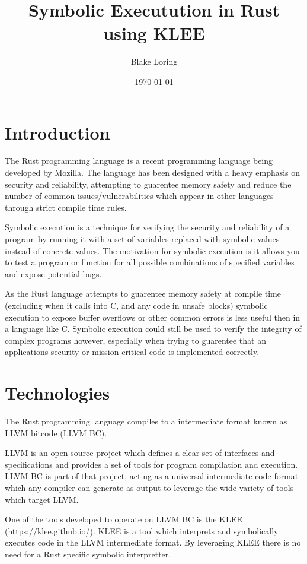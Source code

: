 \documentclass{report}
\begin{document}
\title{Symbolic Executution in Rust using KLEE}
\author{Blake Loring}
\date{\today}

\maketitle

\chapter {Introduction}

The Rust programming language is a recent programming language being developed by Mozilla. The language has been designed with a heavy emphasis on security and reliability, attempting to guarentee memory safety and reduce the number of common issues/vulnerabilities which appear in other languages through strict compile time rules.

Symbolic execution is a technique for verifying the security and reliability of a program by running it with a set of variables replaced with symbolic values instead of concrete values. The motivation for symbolic execution is it allows you to test a program or function for all possible combinations of specified variables and expose potential bugs.

As the Rust language attempts to guarentee memory safety at compile time (excluding when it calls into C, and any code in unsafe blocks) symbolic execution to expose buffer overflows or other common errors is less useful then in a language like C. Symbolic execution could still be used to verify the integrity of complex programs however, especially when trying to guarentee that an applications security or mission-critical code is implemented correctly.

\chapter {Technologies}

The Rust programming language compiles to a intermediate format known as LLVM bitcode (LLVM BC).

LLVM is an open source project which defines a clear set of interfaces and specifications and provides a set of tools for program compilation and execution. LLVM BC is part of that project, acting as a universal intermediate code format which any compiler can generate as output to leverage the wide variety of tools which target LLVM.

One of the tools developed to operate on LLVM BC is the KLEE (https://klee.github.io/). KLEE is a tool which interprets and symbolically executes code in the LLVM intermediate format. By leveraging KLEE there is no need for a Rust specific symbolic interpretter.
\end{document}
